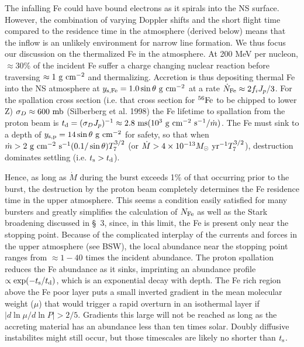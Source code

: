 \documentclass[iop,apjl,letterpaper]{emulateapj}
\begin{document}
 The infalling Fe could have bound electrons as it spirals into the NS
surface. However, the combination of varying Doppler shifts and the
short flight time compared to the residence time in the atmosphere
(derived below) means that the inflow is an unlikely environment for
narrow line formation. We thus focus our discussion on the thermalized
Fe in the atmosphere.  At 200 MeV per nucleon, $\approx 30$\% of the
incident Fe suffer a charge changing nuclear reaction before
traversing $\approx 1\ {\rm g \ cm^{-2}}$ and thermalizing. Accretion
is thus depositing thermal Fe into the NS atmosphere at $y_{\rm s,
Fe}=1.0\sin\theta\ {\rm g \ cm^{-2}}$ at a rate $\dot N_{\rm
Fe}\approx 2f_i J_p/3$. For the spallation cross section (i.e. that
cross section for $^{56}{\rm Fe}$ to be chipped to lower Z)
$\sigma_D\approx 600 \ {\rm mb}$ (Silberberg et al. 1998) the Fe
lifetime to spallation from the proton beam is $t_{\rm d}=(\sigma_D
J_p)^{-1}\approx 2.8\ {\rm ms}(10^3\ {\rm g \ cm^{-2} \ s^{-1}}/\dot
m) $. The Fe must sink to a depth of $y_{\rm s,p}=14\sin\theta\ {\rm g
\ cm^{-2}}$ for safety, so that when $\dot m> 2\ {\rm g \ cm^{-2} \
s^{-1}}(0.1/\sin\theta)T_7^{3/2}$ (or $\dot M>4\times 10^{-13}M_\odot
\ {\rm yr^{-1}} T_7^{3/2}$), destruction dominates settling
(i.e. $t_{\rm s}>t_{\rm d}$).

 Hence, as long as $\dot M$ during the burst exceeds 1\% of that
occurring prior to the burst, the destruction by the proton beam
completely determines the Fe residence time in the upper atmosphere.
This seems a condition easily satisfied for many bursters and greatly
simplifies the calculation of $N_{\rm Fe}$ as well as the Stark
broadening discussed in \S~3, since, in this limit, the Fe is present
only near the stopping point. Because of the complicated interplay of
the currents and forces in the upper atmosphere (see BSW), the local
abundance near the stopping point ranges from $\approx 1-40$ times the
incident abundance. The proton spallation reduces the Fe abundance as
it sinks, imprinting an abundance profile $\propto \exp(-t_{\rm
s}/t_{\rm d})$, which is an exponential decay with depth. The Fe rich
region above the Fe poor layer puts a small inverted gradient in the
mean molecular weight ($\mu$) that would trigger a rapid overturn in
an isothermal layer if $|d\ln\mu/d\ln P|>2/5$. Gradients this large
will not be reached as long as the accreting material has an abundance
less than ten times solar. Doubly diffusive instabilites might still
occur, but those timescales are likely no shorter than $ t_{\rm s}$.
\end{document}
